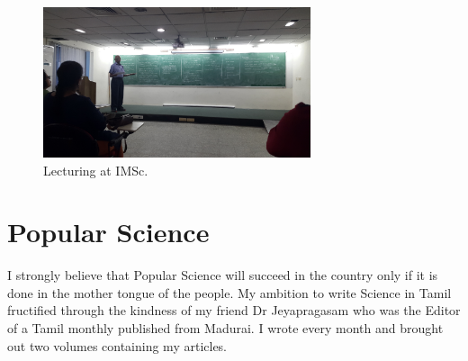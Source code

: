 
\begin{figure}[h]
\vspace{-.1cm}
\centering
\includegraphics[width=0.7\textwidth]{images/rajaji-teach1.jpg}
\caption{Lecturing at IMSc.}
\end{figure}

\vspace{-.5cm}

\section*{Popular Science}

I strongly believe that Popular Science will succeed in the country only if it is done in the mother tongue of the people. My ambition to write Science in Tamil fructified through the kindness of my friend Dr Jeyapragasam who was the Editor of a Tamil monthly published from Madurai. I wrote every month and brou\-ght out two volumes containing my articles.

\newpage

